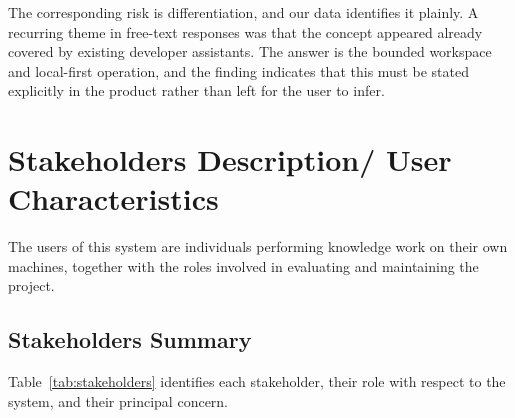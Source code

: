 \documentclass{FastFyp}
\begin{document}
The corresponding risk is differentiation, and our data identifies it plainly. A recurring theme in free-text responses was that the concept appeared already covered by existing developer assistants. The answer is the bounded workspace and local-first operation, and the finding indicates that this must be stated explicitly in the product rather than left for the user to infer.

\section{Stakeholders Description/ User Characteristics}
The users of this system are individuals performing knowledge work on their own machines, together with the roles involved in evaluating and maintaining the project.

\subsection{Stakeholders Summary}
Table~\ref{tab:stakeholders} identifies each stakeholder, their role with respect to the system, and their principal concern.
\end{document}
